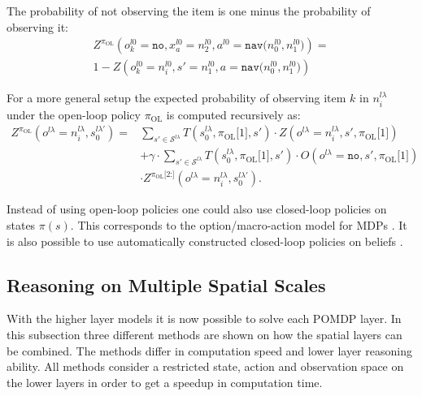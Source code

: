 \begin{example}
The probability of not observing the item is one minus the probability of observing it:
\begin{multline}
    Z^{\pi_\text{OL}}\left( o_k^{l0}=\texttt{no}, x_a^{l0}=n_2^{l0}, a^{l0}=\texttt{nav($n_0^{l0},n_1^{l0}$)}\right) = \\
    1 - Z\left(o_k^{l0}=n_i^{l0},s'=n_1^{l0}, a=\texttt{nav($n_0^{l0}, n_1^{l0}$)}\right)
\end{multline}
\demo
\end{example}

For a more general setup the expected probability of observing item $k$ in $n_i^{l\lambda}$ under the open-loop policy $\pi_\text{OL}$ is computed recursively as:
\begin{equation}
    \begin{aligned}
        Z^{\pi_\text{OL}}\left( o^{l\lambda}=n_i^{l\lambda}, s_0^{l\lambda\prime}\right) = &\sum_{s'\in\mathcal{S}^{l\lambda}} T\left( s_0^{l\lambda}, \pi_\text{OL}\texttt{[$1$]}, s' \right) \cdot Z\left(o^{l\lambda}=n_i^{l\lambda}, s', \pi_\text{OL}\texttt{[$1$]}\right) \\
        &+ \gamma \cdot \sum_{s'\in\mathcal{S}^{l\lambda}} T\left( s_0^{l\lambda}, \pi_\text{OL}\texttt{[$1$]}, s' \right) \cdot O\left( o^{l\lambda}=\texttt{no}, s', \pi_\text{OL}\texttt{[$1$]} \right)\\
        &\cdot Z^{\pi_\text{OL}\texttt{[$2$:]}}\left( o^{l\lambda}=n_i^{l\lambda}, s_0^{l\lambda'} \right).
    \end{aligned}
\end{equation}

Instead of using open-loop policies one could also use closed-loop policies on states $\pi(s)$. This corresponds to the option/macro-action model for MDPs \cite{SUTTON1999181, DBLP:journals/corr/abs-1301-7381}. It is also possible to use automatically constructed closed-loop policies on beliefs \cite{7140035}.


\subsection{Reasoning on Multiple Spatial Scales}\label{sec:M1toM3}
With the higher layer models it is now possible to solve each POMDP layer. In this subsection three different methods are shown on how the spatial layers can be combined. The methods differ in computation speed and lower layer reasoning ability. 
All methods consider a restricted state, action and observation space on the lower layers in order to get a speedup in computation time. 
%
